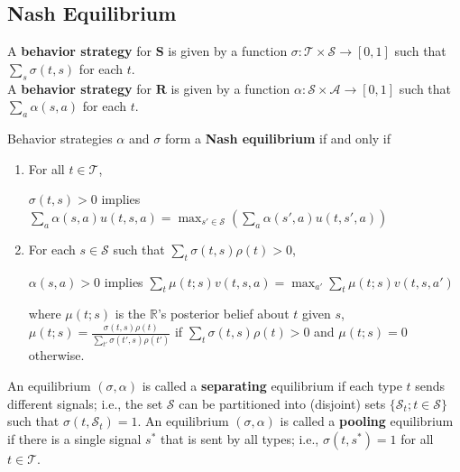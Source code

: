 \documentclass[11pt]{elegantbook_2}
\begin{document}
\subsection{Nash Equilibrium}
\begin{definition}[Strategy]
    A \textbf{behavior strategy} for $\mathbf{S}$ is given by a function $\sigma: \mathcal{T}\times\mathcal{S} \rightarrow [0,1]$ such that $\sum_s \sigma(t,s)$ for each $t$.\\
    A \textbf{behavior strategy} for $\mathbf{R}$ is given by a function $\alpha: \mathcal{S}\times\mathcal{A} \rightarrow [0,1]$ such that $\sum_a \alpha(s,a)$ for each $t$.
\end{definition}

\begin{definition}
    Behavior strategies $\alpha$ and $\sigma$ form a \textbf{Nash equilibrium} if and only if
    \begin{enumerate}
        \item For all $t\in \mathcal{T}$,
        \begin{center}
            $\sigma(t,s)>0$ implies $\sum_a \alpha(s,a)u(t,s,a) = \max_{s'\in \mathcal{S}}\left(\sum_a \alpha(s',a)u(t,s',a)\right)$
        \end{center}
        \item For each $s\in \mathcal{S}$ such that $\sum_{t}\sigma(t,s)\rho(t)>0$,
        \begin{center}
            $\alpha(s,a)>0$ implies $\sum_{t}\mu(t;s)v(t,s,a) = \max_{a'}\sum_{t}\mu(t;s)v(t,s,a')$
        \end{center}
        where $\mu(t;s)$ is the $\mathbb{R}$'s posterior belief about $t$ given $s$, $\mu(t;s)=\frac{\sigma(t,s)\rho(t)}{\sum_{t'}\sigma(t',s)\rho(t')}$ if $\sum_t\sigma(t,s)\rho(t)>0$ and $\mu(t;s)=0$ otherwise.
    \end{enumerate}
\end{definition}

\begin{definition}
    An equilibrium $(\sigma,\alpha)$ is called a \textbf{separating} equilibrium if each type $t$ sends different signals; i.e., the set $\mathcal{S}$ can be partitioned into (disjoint) sets $\{\mathcal{S}_t; t\in \mathcal{S}\}$ such that $\sigma(t, \mathcal{S}_t) = 1$. An equilibrium $(\sigma,\alpha)$ is called a \textbf{pooling} equilibrium if there is a single signal $s^*$ that is sent by all types; i.e., $\sigma(t, s^*) = 1$ for all $t\in \mathcal{T}$.
\end{definition}
\end{document}
